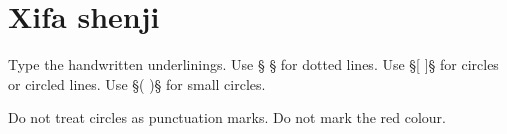 \documentclass[fontsize=11pt, paper=a4, 
DIV15,
normalheadings,
parskip=half-, 
pointlessnumbers]{scrartcl}
\begin{document}
%




\section{Xifa shenji \, }

\begin{mainrule}
Type the handwritten underlinings. Use §{ }§ for dotted lines. Use §[ ]§ for circles or circled lines. Use §( )§ for small circles. 
\end{mainrule}

\begin{clarification}
Do not treat circles as punctuation marks.
Do not mark the red colour.
\end{clarification}


\end{document}
